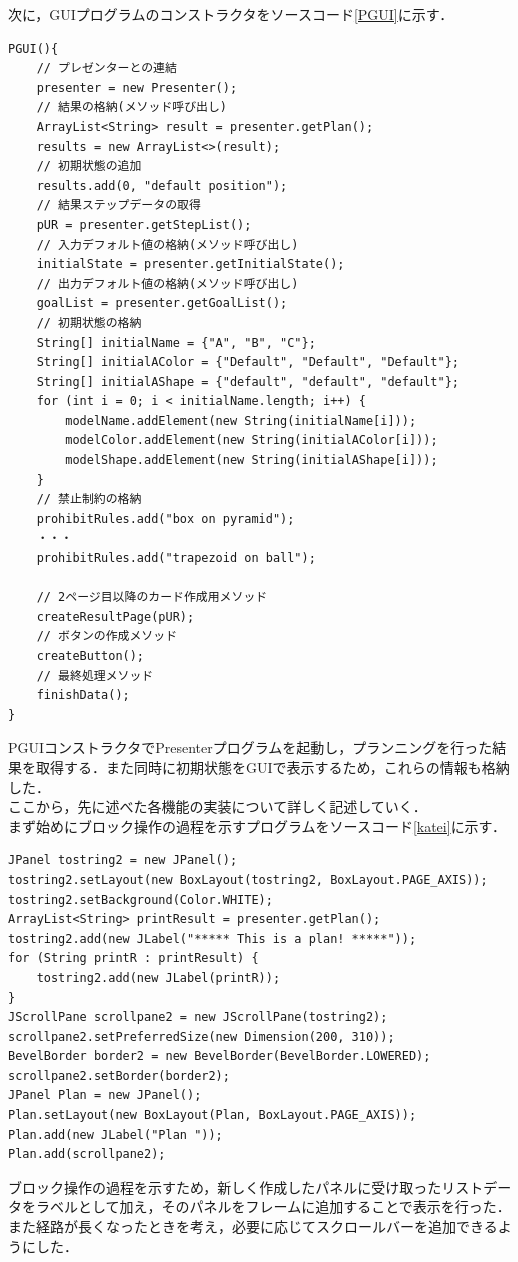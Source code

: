 \documentclass[12pt]{jarticle}
\begin{document}
次に，GUIプログラムのコンストラクタをソースコード\ref{PGUI}に示す．
\begin{lstlisting}[caption=コンストラクタ,label=PGUI]
PGUI(){
	// プレゼンターとの連結
	presenter = new Presenter();
	// 結果の格納(メソッド呼び出し)
	ArrayList<String> result = presenter.getPlan();
	results = new ArrayList<>(result);
	// 初期状態の追加
	results.add(0, "default position");
	// 結果ステップデータの取得
	pUR = presenter.getStepList();
	// 入力デフォルト値の格納(メソッド呼び出し)
	initialState = presenter.getInitialState();
	// 出力デフォルト値の格納(メソッド呼び出し)
	goalList = presenter.getGoalList();
	// 初期状態の格納
	String[] initialName = {"A", "B", "C"};
	String[] initialAColor = {"Default", "Default", "Default"};
	String[] initialAShape = {"default", "default", "default"};
	for (int i = 0; i < initialName.length; i++) {
		modelName.addElement(new String(initialName[i]));
		modelColor.addElement(new String(initialAColor[i]));
		modelShape.addElement(new String(initialAShape[i]));
	}
	// 禁止制約の格納
	prohibitRules.add("box on pyramid");
	・・・
	prohibitRules.add("trapezoid on ball");

	// 2ページ目以降のカード作成用メソッド
	createResultPage(pUR);
	// ボタンの作成メソッド
	createButton();
	// 最終処理メソッド
	finishData();
}
\end{lstlisting}
PGUIコンストラクタでPresenterプログラムを起動し，プランニングを行った結果を取得する．また同時に初期状態をGUIで表示するため，これらの情報も格納した．\\

ここから，先に述べた各機能の実装について詳しく記述していく．\\
まず始めにブロック操作の過程を示すプログラムをソースコード\ref{katei}に示す．
\begin{lstlisting}[caption=過程表示,label=katei]
JPanel tostring2 = new JPanel();
tostring2.setLayout(new BoxLayout(tostring2, BoxLayout.PAGE_AXIS));
tostring2.setBackground(Color.WHITE);
ArrayList<String> printResult = presenter.getPlan();
tostring2.add(new JLabel("***** This is a plan! *****"));
for (String printR : printResult) {
	tostring2.add(new JLabel(printR));
}
JScrollPane scrollpane2 = new JScrollPane(tostring2);
scrollpane2.setPreferredSize(new Dimension(200, 310));
BevelBorder border2 = new BevelBorder(BevelBorder.LOWERED);
scrollpane2.setBorder(border2);
JPanel Plan = new JPanel();
Plan.setLayout(new BoxLayout(Plan, BoxLayout.PAGE_AXIS));
Plan.add(new JLabel("Plan "));
Plan.add(scrollpane2);
\end{lstlisting}
ブロック操作の過程を示すため，新しく作成したパネルに受け取ったリストデータをラベルとして加え，そのパネルをフレームに追加することで表示を行った．また経路が長くなったときを考え，必要に応じてスクロールバーを追加できるようにした．\\
\end{document}
